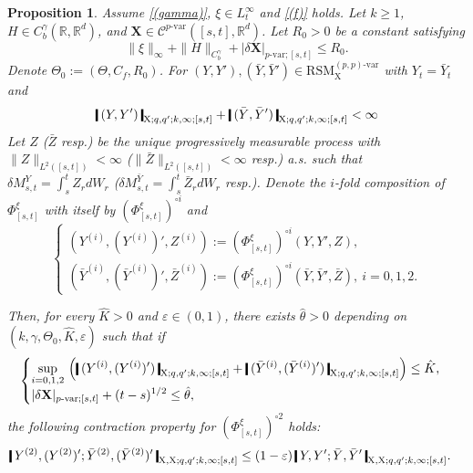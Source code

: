 \documentclass[11pt,reqno]{amsart}
\newtheorem{proposition}[lemma]{Proposition}
\numberwithin{equation}{section}
\def\R{\mathbb R}
\newcommand{\shortthickbar}{%
  \vcenter{\hbox{\rule{1.8pt}{2.2ex}}}%
}
\newcommand{\thicknm}[1]{%
  \mathopen{\shortthickbar}%
  \mkern4mu #1 \mkern4mu%
  \mathclose{\shortthickbar}%
}
\begin{document}
\begin{proposition}\label{prop:contraction}
Assume \ref{(gamma)}, $\xi \in L^{\infty}_t$ and \ref{(f)} holds. Let $k \ge 1$, $H\in C^{\gamma}_{b}(\R,\R^d)$, and $\mathbf X\in \mathscr{C}^{p\text{-}\mathrm{var}}([s,t], \R^{d})$. Let $R_0 > 0$ be a constant  satisfying 
\begin{equation*}
\|\xi\|_{\infty} + \|H\|_{C^{\gamma}_b} + |\delta \mathbf X |_{p\text{-}\mathrm{var};[s,t]} \le R_0.
\end{equation*}
Denote $\Theta_0 := (\Theta,C_f, R_0)$. For $(Y,Y'), (\bar Y, \bar Y') \in \mathrm{RSM}^{(p,p)\text{-}\mathrm{var}}_{\mathrm X}$ with $Y_t = \bar Y_t$ and 
\begin{equation*}
\thicknm{(Y,Y')}_{\mathrm X;q,q';k,\infty;[s,t]} + \thicknm{(\bar Y,\bar Y')}_{\mathrm X;q,q';k,\infty;[s,t]} < \infty
\end{equation*}
Let $Z$ ($\bar Z$ resp.) be the unique progressively measurable process with $\|Z\|_{L^{2}([s,t])} < \infty$ ($\|\bar Z\|_{L^{2}([s,t])} < \infty$ resp.) a.s. such that $\delta M^{Y}_{s,t} = \int_{s}^{t} Z_r dW_r$ ($\delta M^{\bar Y}_{s,t} = \int_{s}^{t} \bar Z_r dW_r$ resp.). Denote the $i$-fold composition of $\Phi^{\xi}_{[s,t]}$ with itself by $(\Phi^{\xi}_{[s,t]})^{\circ i}$ and 
\begin{equation*}
\begin{cases}\displaystyle
(Y^{(i)},(Y^{(i)})',Z^{(i)}) := \left(\Phi^{\xi}_{[s,t]}\right)^{\circ i} (Y,Y',Z),\ \\
(\bar Y^{(i)},(\bar Y^{(i)})',\bar Z^{(i)}) := \left(\Phi^{\xi}_{[s,t]}\right)^{\circ i} (\bar Y,\bar Y',\bar Z),\ i = 0,1,2.
\end{cases}
\end{equation*}

Then, for every $\hat K > 0$ and $\varepsilon \in (0,1)$, there exists $\hat \theta > 0$ depending on $(k,\gamma,\Theta_0,\hat K,\varepsilon)$ such that if 
\begin{equation*}
\begin{cases}\displaystyle
\sup_{i=0,1,2}\,
\Big(\thicknm{(Y^{(i)},(Y^{(i)})')}_{\mathrm X;q,q';k,\infty;[s,t]} +  \thicknm{(\bar Y^{(i)},(\bar Y^{(i)})')}_{\mathrm X;q,q';k,\infty;[s,t]}\Big) \le \hat K,\\ \displaystyle
|\delta \mathbf X|_{p\text{-}\mathrm{var};[s,t]} + (t-s)^{1/2} \le \hat \theta,
\end{cases}
\end{equation*}
the following contraction property for $(\Phi^{\xi}_{[s,t]})^{\circ 2}$ holds: 
\begin{equation*}
\begin{aligned}
&\thicknm{Y^{(2)},(Y^{(2)})'; \bar Y^{(2)},(\bar Y^{(2)})'}_{\mathrm X,\mathrm X;q,q';k,\infty;[s,t]}\le (1 - \varepsilon) \, \thicknm{Y,Y'; \bar Y, \bar Y'}_{\mathrm X,\mathrm X;q,q';k,\infty;[s,t]} .
\end{aligned}
\end{equation*}
 
\end{proposition}
\end{document}
